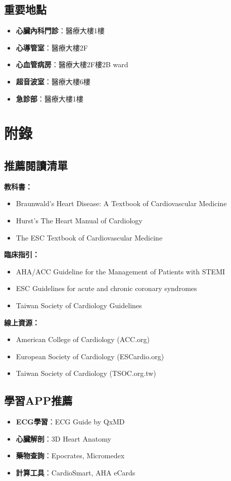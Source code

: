 \documentclass[12pt,a4paper]{article}
\begin{document}
\subsection{重要地點}
\begin{itemize}[nosep]
    \item \textbf{心臟內科門診}：醫療大樓1樓
    \item \textbf{心導管室}：醫療大樓2F
    \item \textbf{心血管病房}：醫療大樓2F樓2B ward
    \item \textbf{超音波室}：醫療大樓6樓
    \item \textbf{急診部}：醫療大樓1樓
\end{itemize}

\section{附錄}

\subsection{推薦閱讀清單}
\textbf{教科書：}
\begin{itemize}[nosep]
    \item Braunwald's Heart Disease: A Textbook of Cardiovascular Medicine
    \item Hurst's The Heart Manual of Cardiology
    \item The ESC Textbook of Cardiovascular Medicine
\end{itemize}

\textbf{臨床指引：}
\begin{itemize}[nosep]
    \item AHA/ACC Guideline for the Management of Patients with STEMI
    \item ESC Guidelines for acute and chronic coronary syndromes
    \item Taiwan Society of Cardiology Guidelines
\end{itemize}

\textbf{線上資源：}
\begin{itemize}[nosep]
    \item American College of Cardiology (ACC.org)
    \item European Society of Cardiology (ESCardio.org)
    \item Taiwan Society of Cardiology (TSOC.org.tw)
\end{itemize}

\subsection{學習APP推薦}
\begin{itemize}[nosep]
    \item \textbf{ECG學習}：ECG Guide by QxMD
    \item \textbf{心臟解剖}：3D Heart Anatomy
    \item \textbf{藥物查詢}：Epocrates, Micromedex
    \item \textbf{計算工具}：CardioSmart, AHA eCards
\end{itemize}
\end{document}
